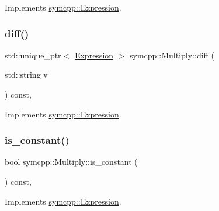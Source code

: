 Implements \mbox{\hyperlink{classsymcpp_1_1Expression_a2e7de5a295ccf0efdc9b34cea7ba3d0b}{symcpp\+::\+Expression}}.

\mbox{\label{classsymcpp_1_1Multiply_a835e55ada54a6c1eeb6d02ceeef83198}} 
\subsubsection{\texorpdfstring{diff()}{diff()}}
{\footnotesize\ttfamily std\+::unique\+\_\+ptr$<$ \mbox{\hyperlink{classsymcpp_1_1Expression}{Expression}} $>$ symcpp\+::\+Multiply\+::diff (\begin{DoxyParamCaption}\item[{std\+::string}]{v }\end{DoxyParamCaption}) const\hspace{0.3cm}{\ttfamily [override]}, {\ttfamily [virtual]}}



Implements \mbox{\hyperlink{classsymcpp_1_1Expression_a032fe8da79d5e231ca2d21a201c8f32d}{symcpp\+::\+Expression}}.

\mbox{\label{classsymcpp_1_1Multiply_a771fc25f8bafd49600c31db11dd72256}} 
\subsubsection{\texorpdfstring{is\_constant()}{is\_constant()}}
{\footnotesize\ttfamily bool symcpp\+::\+Multiply\+::is\+\_\+constant (\begin{DoxyParamCaption}{ }\end{DoxyParamCaption}) const\hspace{0.3cm}{\ttfamily [override]}, {\ttfamily [virtual]}}



Implements \mbox{\hyperlink{classsymcpp_1_1Expression_a30db7917c8948e22330cbe8259caeae2}{symcpp\+::\+Expression}}.

\mbox{\label{classsymcpp_1_1Multiply_afd9f779b82aa2d7a3be63e7b8b0e8eb1}} 

